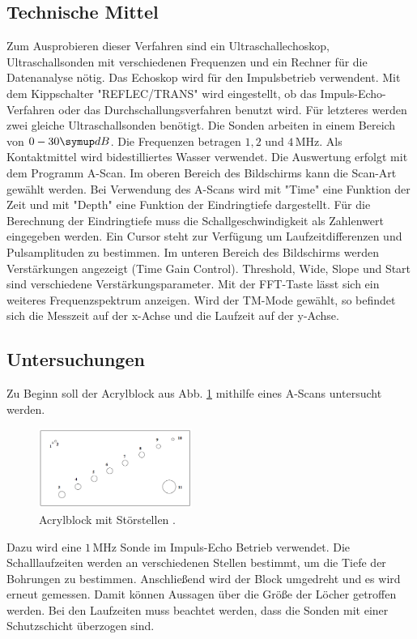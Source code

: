 \subsection{Technische Mittel}
Zum Ausprobieren dieser Verfahren sind ein Ultraschallechoskop, Ultraschallsonden
mit verschiedenen Frequenzen und ein Rechner für die Datenanalyse nötig. Das
Echoskop wird für den Impulsbetrieb verwendent. Mit dem Kippschalter
"REFLEC/TRANS" wird eingestellt, ob das Impuls-Echo-Verfahren oder das
Durchschallungsverfahren benutzt wird. Für letzteres werden zwei gleiche
Ultraschallsonden benötigt. Die Sonden arbeiten in einem Bereich von $0-30 \su{dB}$.
Die Frequenzen betragen $1,2$ und $4 \,\si{\mega\hertz}$. Als Kontaktmittel
wird bidestilliertes Wasser verwendet. Die Auswertung erfolgt mit dem
Programm A-Scan. Im oberen Bereich des Bildschirms kann die Scan-Art gewählt werden.
Bei Verwendung des A-Scans wird mit "Time" eine Funktion der Zeit und mit "Depth"
eine Funktion der Eindringtiefe dargestellt. Für die Berechnung der Eindringtiefe
muss die Schallgeschwindigkeit als Zahlenwert eingegeben werden. Ein Cursor
steht zur Verfügung um Laufzeitdifferenzen und Pulsamplituden zu bestimmen.
Im unteren Bereich des Bildschirms werden Verstärkungen angezeigt (Time Gain
Control). Threshold, Wide, Slope und Start sind verschiedene Verstärkungsparameter.
Mit der FFT-Taste lässt sich ein weiteres Frequenzspektrum anzeigen.
Wird der TM-Mode gewählt, so befindet sich die Messzeit auf der x-Achse und
die Laufzeit auf der y-Achse.

\subsection{Untersuchungen}
Zu Beginn soll der Acrylblock aus Abb. \ref{fig:block} mithilfe eines A-Scans untersucht werden.
\begin{figure}
  \centering
  \includegraphics[width=5cm]{bilder/block.png}
  \caption{Acrylblock mit Störstellen \cite{us2}.}
  \label{fig:block}
\end{figure}
Dazu wird
eine $1 \,\si{\mega\hertz}$ Sonde im Impuls-Echo Betrieb verwendet. Die Schalllaufzeiten
werden an verschiedenen Stellen bestimmt, um die Tiefe der Bohrungen zu bestimmen.
Anschließend wird der Block umgedreht und es wird erneut gemessen. Damit können
Aussagen über die Größe der Löcher getroffen werden. Bei den Laufzeiten muss beachtet werden,
dass die Sonden mit einer Schutzschicht überzogen sind.

